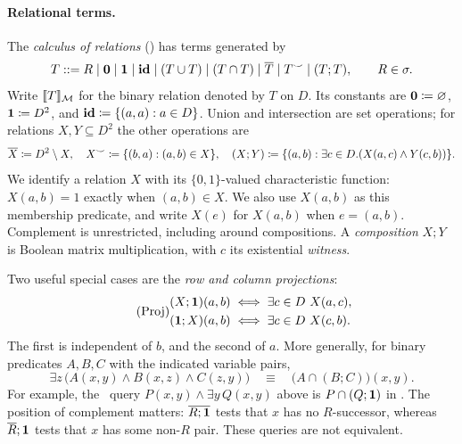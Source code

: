 \paragraph{Relational terms.}
The \emph{calculus of relations} (\CoR) has terms generated by
\[
 T::=R\mid\mathbf{0}\mid\mathbf{1}\mid\mathbf{id}
   \mid(T\cup T)\mid(T\cap T)\mid\overline T
   \mid T^\smile\mid(T;T), \qquad R\in\sigma.
\]
Write $\llbracket T\rrbracket_{\mathcal M}$ for the binary relation denoted by $T$
on $D$. Its constants are
$\mathbf{0}\coloneqq\varnothing$, $\mathbf{1}\coloneqq D^2$, and
$\mathbf{id}\coloneqq\{(a,a):a\in D\}$. Union and intersection are set operations;
for relations $X,Y\subseteq D^2$ the other operations are
\[
  \overline X \coloneqq D^2\setminus X,\quad
  X^\smile \coloneqq \{ (b,a):(a,b)\in X \},\quad
  (X;Y) \coloneqq 
     \{  (a, b) : \exists c\in D. (X(a,c)\land Y(c,b))  \}.
\]
We identify a relation $X$ with its $\{0,1\}$-valued characteristic
function: $X(a,b)=1$ exactly when $(a,b)\in X$. We also use $X(a,b)$
as this membership predicate, and write $X(e)$ for $X(a,b)$ when
$e=(a,b)$. Complement is unrestricted, including around compositions. A \emph{composition} $X;Y$ is Boolean
matrix multiplication, with $c$ its existential \emph{witness}.

Two useful special cases are the \emph{row and column projections}:
\begin{equation*}\tag{Proj}\label{eq:prelim-projections}
 \begin{aligned}
  (X;\mathbf{1})(a,b)&\iff\exists c\in D\ X(a,c),\\
  (\mathbf{1};X)(a,b)&\iff\exists c\in D\ X(c,b).
 \end{aligned}
\end{equation*}
The first is independent of $b$, and the second of $a$. More generally,
for binary predicates $A,B,C$ with the indicated variable pairs,
\begin{equation*}\tag{QE}\label{eq:prelim-elimination}
 \exists z\,\bigl(A(x,y)\land B(x,z)\land C(z,y)\bigr)
 \quad\equiv\quad \bigl(A\cap(B;C)\bigr)(x,y).
\end{equation*}
For example, the \FOtwo\ query
$P(x,y)\land\exists y\,Q(x,y)$ above is $P\cap(Q;\mathbf{1})$ in \CoR.
The position of complement matters: $\overline{R;\mathbf{1}}$ tests that
$x$ has no $R$-successor, whereas $\overline R;\mathbf{1}$ tests that
$x$ has some non-$R$ pair. These queries are not equivalent.

